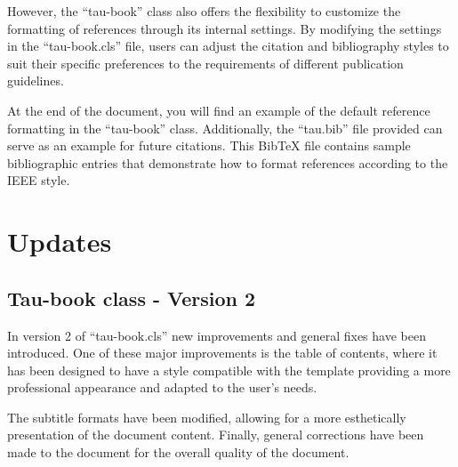 \documentclass[10pt,a4paper,twoside]{tau-book}
\begin{document}
    However, the ``tau-book'' class \cite{dirac} also offers the flexibility to customize the formatting of references through its internal settings. By modifying the settings in the ``tau-book.cls'' file, users can adjust the citation and bibliography styles to suit their specific preferences to the requirements of different publication guidelines.

    At the end of the document, you will find an example of the default reference formatting in the ``tau-book'' class. Additionally, the ``tau.bib'' file provided can serve as an example for future citations. This BibTeX file contains sample bibliographic entries that demonstrate how to format references according to the IEEE style.

\section{Updates}

    \subsection{Tau-book class - Version 2}

        In version 2 of ``tau-book.cls'' new improvements and general fixes have been introduced. One of these major improvements is the table of contents, where it has been designed to have a style compatible with the template providing a more professional appearance and adapted to the user's needs. 

        The subtitle formats have been modified, allowing for a more esthetically presentation of the document content. Finally, general corrections have been made to the document for the overall quality of the document.


\printbibliography

\end{document}
